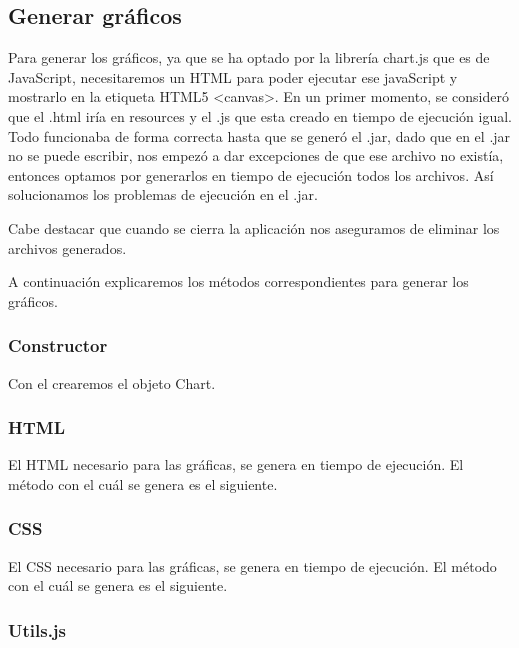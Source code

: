 \subsection{Generar gráficos}\label{generar-graficos}

Para generar los gráficos, ya que se ha optado por la librería chart.js que es de JavaScript, necesitaremos un HTML para poder ejecutar ese javaScript y mostrarlo en la etiqueta HTML5 <canvas>. En un primer momento, se consideró que el .html iría en resources y el .js que esta creado en tiempo de ejecución igual. Todo funcionaba de forma correcta hasta que se generó el .jar, dado que en el .jar no se puede escribir, nos empezó a dar excepciones de que ese archivo no existía, entonces optamos por generarlos en tiempo de ejecución todos los archivos. Así solucionamos los problemas de ejecución en el .jar.

Cabe destacar que cuando se cierra la aplicación nos aseguramos de eliminar los archivos generados.

A continuación explicaremos los métodos correspondientes para generar los gráficos.

\subsubsection{Constructor}\label{constructor-c}

Con el crearemos el objeto Chart.


\subsubsection{HTML}\label{html}

El HTML necesario para las gráficas, se genera en tiempo de ejecución. El método con el cuál se genera es el siguiente.


\subsubsection{CSS}\label{css}

El CSS necesario para las gráficas, se genera en tiempo de ejecución. El método con el cuál se genera es el siguiente.


\newpage\subsubsection{Utils.js}\label{utils}

